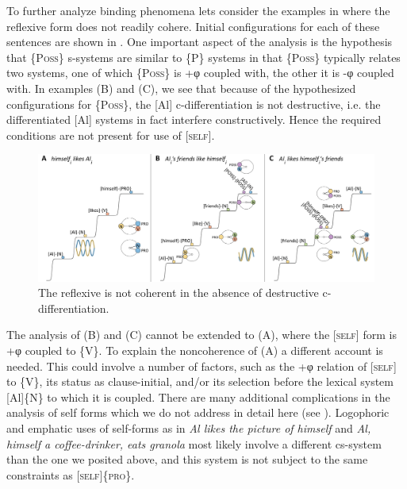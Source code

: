   To further analyze binding phenomena lets consider the examples in  where the reflexive form does not readily cohere. Initial configurations for each of these sentences are shown in {}. One important aspect of the analysis is the hypothesis that \{P\textsc{oss}\} s-systems are similar to \{P\} systems in that \{P\textsc{oss}\} typically relates two systems, one of which \{P\textsc{oss}\} is +φ coupled with, the other it is -φ coupled with. In examples (B) and (C), we see that because of the hypothesized configurations for \{P\textsc{oss}\}, the [Al] c-differentiation is not destructive, i.e. the differentiated [Al] systems in fact interfere constructively. Hence the required conditions are not present for use of [\textsc{self}]. 

\ea\label{ex:7:16}
\z
\z

\begin{figure}
\includegraphics[width=\textwidth]{figures/Tilsen-img157.png}
\caption{The reflexive is not coherent in the absence of destructive c-differentiation.}
\label{fig:7:13}
\end{figure}
 

  The analysis of (B) and (C) cannot be extended to (A), where the [\textsc{self}] form is +φ coupled to \{V\}. To explain the noncoherence of (A) a different account is needed. This could involve a number of factors, such as the +φ relation of [\textsc{self}] to \{V\}, its status as clause-initial, and/or its selection before the lexical system [Al]\{N\} to which it is coupled. There are many additional complications in the analysis of self forms which we do not address in detail here (see \citealt{KönigSiemund2000,Safir2004}). Logophoric and emphatic uses of self-forms as in \textit{Al likes the picture of himself} and \textit{Al, himself a coffee-drinker, eats granola} most likely involve a different cs-system than the one we posited above, and this system is not subject to the same constraints as [\textsc{self}]\{\textsc{pro}\}. 

